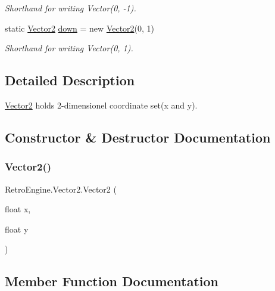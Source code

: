 \begin{DoxyCompactItemize}
\begin{DoxyCompactList}\small\item\em Shorthand for writing Vector(0, -\/1). \end{DoxyCompactList}\item 
static \mbox{\hyperlink{struct_retro_engine_1_1_vector2}{Vector2}} \mbox{\hyperlink{struct_retro_engine_1_1_vector2_a7509cafc4d844d1d23a77757ab8f965e}{down}} = new \mbox{\hyperlink{struct_retro_engine_1_1_vector2}{Vector2}}(0, 1)
\begin{DoxyCompactList}\small\item\em Shorthand for writing Vector(0, 1). \end{DoxyCompactList}\end{DoxyCompactItemize}


\subsection{Detailed Description}
\mbox{\hyperlink{struct_retro_engine_1_1_vector2}{Vector2}} holds 2-\/dimensionel coordinate set(x and y). 



\subsection{Constructor \& Destructor Documentation}
\mbox{\label{struct_retro_engine_1_1_vector2_a91dec465a61c9a79601fd07327619e08}} 
\subsubsection{\texorpdfstring{Vector2()}{Vector2()}}
{\footnotesize\ttfamily Retro\+Engine.\+Vector2.\+Vector2 (\begin{DoxyParamCaption}\item[{float}]{x,  }\item[{float}]{y }\end{DoxyParamCaption})}



\subsection{Member Function Documentation}
\mbox{\label{struct_retro_engine_1_1_vector2_a73c38a3be774dbedc2aac99c16fee060}} 
